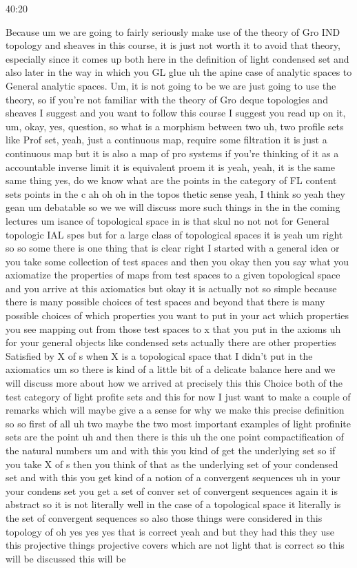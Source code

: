 \begin{unfinished}{40:20}



Because um we are going to fairly seriously make use of the theory of Gro IND topology and sheaves in this course, it is just not worth it to avoid that theory, especially since it comes up both here in the definition of light condensed set and also later in the way in which you GL glue uh the apine case of analytic spaces to General analytic spaces. Um, it is not going to be we are just going to use the theory, so if you're not familiar with the theory of Gro deque topologies and sheaves I suggest and you want to follow this course I suggest you read up on it, um, okay, yes, question, so what is a morphism between two uh, two profile sets like Prof set, yeah, just a continuous map, require some filtration it is just a continuous map but it is also a map of pro systems if you're thinking of it as a accountable inverse limit it is equivalent proem it is yeah, yeah, it is the same same thing yes, do we know what are the points in the category of FL content sets points in the c ah oh oh in the topos thetic sense yeah, I think so yeah they gean um debatable so we we will discuss more such things in the in the coming lectures um isance of topological space in is that skul no not not for General topologic IAL spes but for a large class of topological spaces it is yeah um right so so some there is one thing that is clear right I started with a general idea or you take some collection of test spaces and then you okay then you say what you axiomatize the properties of maps from test spaces to a given topological space and you arrive at this axiomatics but okay it is actually not so simple because there is many possible choices of test spaces and beyond that there is many possible choices of which properties you want to put in your act which properties you see mapping out from those test spaces to x that you put in the axioms uh for your general objects like condensed sets actually there are other properties Satisfied by X of s when X is a topological space that I didn't put in the axiomatics um so there is kind of a little bit of a delicate balance here and we will discuss more about how we arrived at precisely this this Choice both of the test category of light profite sets and this for now I just want to make a couple of remarks which will maybe give a a sense for why we make this precise definition so so first of all uh two maybe the two most important examples of light profinite sets are the point uh and then there is this uh the one point compactification of the natural numbers um and with this you kind of get the underlying set so if you take X of s then you think of that as the underlying set of your condensed set and with this you get kind of a notion of a convergent sequences uh in your your condens set you get a set of conver set of convergent sequences again it is abstract so it is not literally well in the case of a topological space it literally is the set of convergent sequences so also those things were considered in this topology of oh yes yes yes that is correct yeah and but they had this they use this projective things projective covers which are not light that is correct so this will be discussed this will be 
\end{unfinished}
